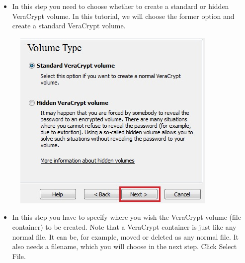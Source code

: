 \documentclass{tufte-handout}
\begin{document}
\begin{enumerate}
\begin{figure}
	\end{figure}
	\begin{itemize}
		\item  In this step you need to choose whether to create a standard or hidden VeraCrypt volume. In this tutorial, we will choose the former option and create a standard VeraCrypt volume.
	\end{itemize}
	\begin{figure}%
		\includegraphics[width=\linewidth]{img/vc_install_3.png}
	\end{figure}
	\begin{itemize}
		\item  In this step you have to specify where you wish the VeraCrypt volume (file container) to be created. Note that a VeraCrypt container is just like any normal file. It can be, for example, moved or deleted as any normal file. It also needs a filename, which you will choose in the next step.  Click Select File.
	\end{itemize}
	\begin{figure}%

\end{figure}
\end{enumerate}
\end{document}
